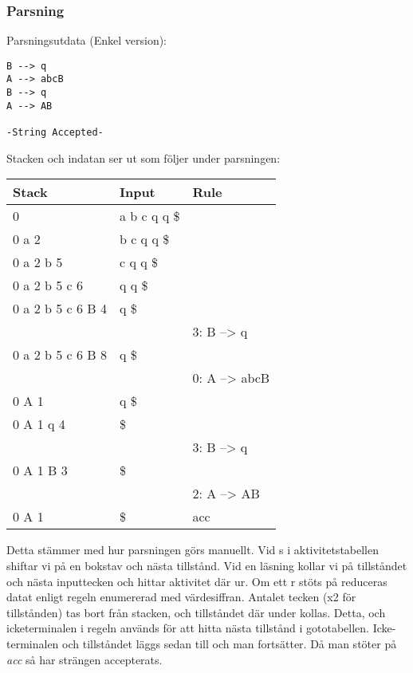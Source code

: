 \documentclass[10pt, titlepage, oneside, a4paper]{article}
\begin{document}
	
	\pagebreak
	
	\subsubsection{Parsning}
	
	Parsningsutdata (Enkel version):	
	
\begin{verbatim}
B --> q 
A --> abcB
B --> q
A --> AB

-String Accepted-
\end{verbatim}

	
	Stacken och indatan ser ut som följer under parsningen:

	
	\begin{centering}
		\begin{table}[h!]
		\begin{tabular}{ | l | l | l | }
		\hline
		\textbf{Stack} & \textbf{Input} & \textbf{Rule} \\ \hline
 0	&		 a b c q q \$ & \\
 0 a 2 	&		  b c q q \$ & \\
 0 a 2 b  5 	&		 c q q \$ & \\
 0 a 2 b  5 c 6 	&		 q q \$ & \\
 0 a 2 b 5 c 6 B 4	&		 q \$ & \\
&& 3: B --> q\\
 0 a 2 b 5 c 6 B 8 	&		 q \$ & \\
&& 0: A --> abcB\\
 0 A 1 	&		 q \$ & \\
 0 A 1 q 4 	&		\$ & \\
&& 3: B --> q\\
 0 A 1 B 3 	&		 \$ & \\
&& 2: A --> AB\\
 0 A 1 	&		 \$ & acc \\
		\hline
		\end{tabular}
		\end{table}
		\end{centering}
		
		Detta stämmer med hur parsningen görs manuellt. Vid s i aktivitetstabellen shiftar vi på en bokstav och nästa tillstånd. Vid en läsning kollar vi på tillståndet och nästa inputtecken och hittar aktivitet där ur. Om ett r stöts på reduceras datat enligt regeln enumererad med värdesiffran. Antalet tecken (x2 för tillstånden) tas bort från stacken, och tillståndet där under kollas. Detta, och icketerminalen i regeln används för att hitta nästa tillstånd i gototabellen. Icke-terminalen och tillståndet läggs sedan till och man fortsätter. Då man stöter på \textit{acc} så har strängen accepterats.
		
\end{document}
